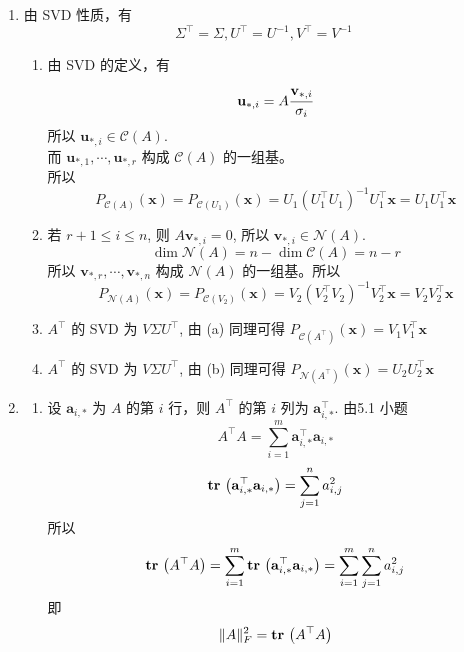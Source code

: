 \documentclass[11pt,letter,notitlepage]{article}
\DeclareMathOperator*{\tr}{\bf tr\,}
\begin{document}
\begin{solution}
    \begin{enumerate}
        \item 由 SVD 性质，有
              $$\Sigma^\top=\Sigma, U^\top=U^{-1}, V^\top=V^{-1}$$
              \begin{enumerate}
                  \item 由 SVD 的定义，有
                  $$\mathbf{u}_{*,i}=A\cfrac{\mathbf{v}_{*,i}}{\sigma_i}$$
                  所以 $\mathbf{u}_{*,i} \in \mathcal{C}(A)$. \\
                  而 $\mathbf{u}_{*,1},\cdots, \mathbf{u}_{*,r}$ 构成 $\mathcal{C}(A)$ 的一组基。\\
                  所以
                  $$P_{\mathcal{C}(A)}(\mathbf{x})=P_{\mathcal{C}(U_1)}(\mathbf{x})=U_1 (U_1^\top U_1)^{-1} U_1^\top\mathbf{x}=U_1 U_1^\top \mathbf{x}$$
                  \item 若 $r+1 \leq i \leq n$, 则 $A\mathbf{v}_{*,i}=0$, 所以 $\mathbf{v}_{*,i}\in \mathcal{N}(A)$.\\
                  $$\dim \mathcal{N}(A) =n -\dim \mathcal{C}(A)=n-r$$
                  所以 $\mathbf{v}_{*,r},\cdots,\mathbf{v}_{*,n}$ 构成 $\mathcal{N}(A)$ 的一组基。所以
                  $$P_{\mathcal{N}(A)}(\mathbf{x})=P_{\mathcal{C}(V_2)}(\mathbf{x})=V_2 (V_2^\top V_2)^{-1} V_2^\top\mathbf{x}=V_2 V_2^\top \mathbf{x}$$
                  \item $A^\top$ 的 SVD 为 $V\Sigma U^\top$, 由 (a) 同理可得 $P_{\mathcal{C}(A^\top)}(\mathbf{x})=V_1 V_1^\top \mathbf{x}$
                  \item $A^\top$ 的 SVD 为 $V\Sigma U^\top$, 由 (b) 同理可得 $P_{\mathcal{N}(A^\top)}(\mathbf{x})=U_2 U_2^\top \mathbf{x}$
                \end{enumerate}
        \item \begin{enumerate}
                  \item  设 $\mathbf{a}_{i,*}$ 为 $A$ 的第 $i$ 行，则 $A^\top$ 的第 $i$ 列为 $\mathbf{a}_{i,*}^\top$.
                        由5.1 小题
                        $$A^\top A=\sum_{i=1}^{m}\mathbf{a}_{i,*}^\top \mathbf{a}_{i,*}$$
                        $$\tr \left( \mathbf{a}_{i,*}^\top \mathbf{a}_{i,*} \right)=\sum_{j=1}^{n} a_{i,j}^2$$
                        所以 $$\tr \left( A^\top A \right)=\sum_{i=1}^{m} \tr \left( \mathbf{a}_{i,*}^\top \mathbf{a}_{i,*} \right)=\sum_{i=1}^{m} \sum_{j=1}^{n} a_{i,j}^2$$
                        即
                        $$\|A\|_F^2=\tr \left(A^\top A \right)$$

\end{enumerate}
\end{enumerate}
\end{solution}
\end{document}
